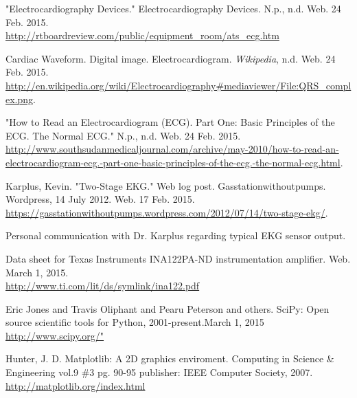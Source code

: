 \documentclass[11pt, oneside]{article}   	%
\begin{document}
\pagebreak
\begin{thebibliography}{14}

"Electrocardiography Devices." Electrocardiography Devices. N.p., n.d. Web. 24 Feb. 2015. \\ \url{http://rtboardreview.com/public/equipment_room/ats_ecg.htm}

Cardiac Waveform. Digital image. Electrocardiogram. \textit{Wikipedia}, n.d. Web. 24 Feb. 2015. \\ \url{http://en.wikipedia.org/wiki/Electrocardiography#mediaviewer/File:QRS_complex.png}.

"How to Read an Electrocardiogram (ECG). Part One: Basic Principles of the ECG. The Normal ECG." N.p., n.d. Web. 24 Feb. 2015. \\ \url{http://www.southsudanmedicaljournal.com/archive/may-2010/how-to-read-an-electrocardiogram-ecg.-part-one-basic-principles-of-the-ecg.-the-normal-ecg.html}.

Karplus, Kevin. "Two-Stage EKG." Web log post. Gasstationwithoutpumps. Wordpress, 14 July 2012. Web. 17 Feb. 2015. \\ \url{https://gasstationwithoutpumps.wordpress.com/2012/07/14/two-stage-ekg/}.

Personal communication with Dr. Karplus regarding typical EKG sensor output.

Data sheet for Texas Instruments INA122PA-ND instrumentation amplifier. Web. March 1, 2015.\\ \url{http://www.ti.com/lit/ds/symlink/ina122.pdf}

Eric Jones and Travis Oliphant and Pearu Peterson and others. SciPy: Open source scientific tools for Python, 2001-present.March 1, 2015
\url{http://www.scipy.org/"}

Hunter, J. D. Matplotlib: A 2D graphics enviroment.
Computing in Science \& Engineering vol.9 \#3 pg. 90-95
publisher: IEEE Computer Society, 2007. \url{http://matplotlib.org/index.html}



\end{thebibliography}
\end{document}
